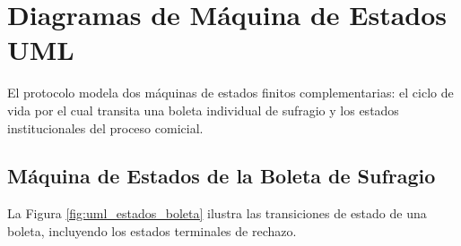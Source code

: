 \section{Diagramas de Máquina de Estados UML}
\label{sec:diagramas_estados}

El protocolo modela dos máquinas de estados finitos complementarias: el ciclo de vida por el cual transita una boleta individual de sufragio y los estados institucionales del proceso comicial.

\subsection{Máquina de Estados de la Boleta de Sufragio}

La Figura \ref{fig:uml_estados_boleta} ilustra las transiciones de estado de una boleta, incluyendo los estados terminales de rechazo.

